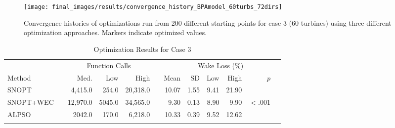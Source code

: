 \documentclass[a4paper]{jpconf}
\begin{document}
%
%
%
\begin{figure}[h]
	\centering
	\begin{minipage}[t]{.75\textwidth}
		\centering
		\texttt{[image: final\_images/results/convergence\_history\_BPAmodel\_60turbs\_72dirs]}  
		\caption{Convergence histories of optimizations run from 200 different starting points for case 3 (60 turbines) using three different optimization approaches. Markers indicate optimized values.}
		\label{fig:case-3-histories}
	\end{minipage} 
\end{figure}
%
\begin{table}[h]
	\caption{Optimization Results for Case 3}
	\label{tab:case3}
	\centering
	\begin{tabular}{lcrrrcrrrrrr}
		\br
		& & \multicolumn{3}{c}{Function Calls} &  & \multicolumn{6}{c}{\quad \quad \quad \quad \quad Wake Loss (\%) \quad \quad \quad \quad \quad} \\
		\cline{3-5}\cline{7-12}
		Method  & & Med. & Low & High & & Mean & SD & Low & High & $p$\\
		\cline{1-1}\cline{3-5}\cline{7-12}
		SNOPT  & & 4,415.0 & 254.0 & 20,318.0 & & 10.07 & 1.55 & 9.41 & 21.90 &  \\
		SNOPT+WEC & & 12,970.0 & 5045.0& 34,565.0 &  &  9.30 & 0.13 & 8.90 & 9.90 & $<.001$ \\
	    ALPSO & & 2042.0 & 170.0 & 6,218.0 & & 10.33 & 0.39 & 9.52 & 12.62 &\\
		\br
	\end{tabular}
\end{table}
\end{document}
